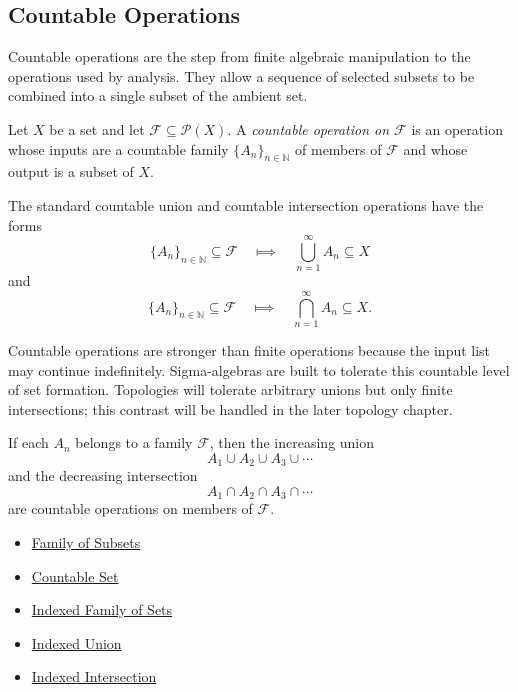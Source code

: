 \subsection{Countable Operations}

\begin{remark*}[Exposition]
Countable operations are the step from finite algebraic manipulation to the
operations used by analysis.  They allow a sequence of selected subsets to be
combined into a single subset of the ambient set.
\end{remark*}

\begin{definition}\label{def:countable-operation-on-family}
Let \(X\) be a set and let \(\mathcal{F}\subseteq\mathcal{P}(X)\).  A
\emph{countable operation on \(\mathcal{F}\)} is an operation whose inputs are
a countable family \(\{A_n\}_{n\in\mathbb{N}}\) of members of \(\mathcal{F}\)
and whose output is a subset of \(X\).
\end{definition}

\begin{remark*}
The standard countable union and countable intersection operations have the
forms
\[
  \{A_n\}_{n\in\mathbb{N}}\subseteq\mathcal{F}
  \quad\Longmapsto\quad
  \bigcup_{n=1}^{\infty}A_n\subseteq X
\]
and
\[
  \{A_n\}_{n\in\mathbb{N}}\subseteq\mathcal{F}
  \quad\Longmapsto\quad
  \bigcap_{n=1}^{\infty}A_n\subseteq X.
\]
\end{remark*}

\begin{remark*}[Interpretation]
Countable operations are stronger than finite operations because the input
list may continue indefinitely.  Sigma-algebras are built to tolerate this
countable level of set formation.  Topologies will tolerate arbitrary unions
but only finite intersections; this contrast will be handled in the later
topology chapter.
\end{remark*}

\begin{remark*}[Examples]
If each \(A_n\) belongs to a family \(\mathcal{F}\), then the increasing union
\[
  A_1\cup A_2\cup A_3\cup\cdots
\]
and the decreasing intersection
\[
  A_1\cap A_2\cap A_3\cap\cdots
\]
are countable operations on members of \(\mathcal{F}\).
\end{remark*}

\begin{dependencies}
\begin{itemize}
  \item \hyperref[def:family-of-subsets]{Family of Subsets}
  \item \hyperref[def:countable]{Countable Set}
  \item \hyperref[def:indexed-family]{Indexed Family of Sets}
  \item \hyperref[def:indexed-union]{Indexed Union}
  \item \hyperref[def:indexed-intersection]{Indexed Intersection}
\end{itemize}
\end{dependencies}
